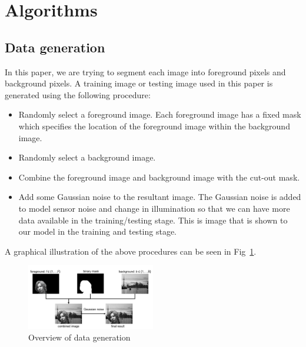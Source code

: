 \documentclass{article} %
\begin{document}
\section{Algorithms}
\label{alog}
\subsection{Data generation}
\label{data_gen}
In this paper, we are trying to segment each image into foreground pixels and background pixels. A training image or testing image used in this paper is generated using the following procedure:
\begin{itemize}

\item Randomly select a foreground image. Each foreground image has a fixed mask which specifies the location of the foreground image within the background image.

\item Randomly select a background image.

\item Combine the foreground image and background image with the cut-out mask.

\item Add some Gaussian noise to the resultant image. The Gaussian noise is added to model sensor noise and change in illumination so that we can have more data available in the training/testing stage. This is image that is shown to our model in the training and testing stage.
\end{itemize}

A graphical illustration of the above procedures can be seen in Fig~\ref{fig:data_generation}.

\begin{figure}[h]
\begin{center}
\includegraphics[width=0.5\textwidth]{data_generation}
\end{center}
\caption{Overview of data generation}
\label{fig:data_generation}
\end{figure}
\end{document}
